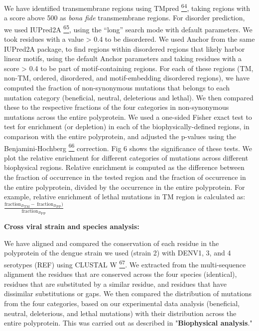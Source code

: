 \documentclass[
]{article}
\begin{document}
We have identified transmembrane regions using TMpred
\href{https://paperpile.com/c/REZjPf/pdAby}{\textsuperscript{64}},
taking regions with a score above 500 as \emph{bona fide} transmembrane
regions. For disorder prediction, we used IUPred2A
\href{https://paperpile.com/c/REZjPf/GYlhT}{\textsuperscript{65}}, using
the ``long'' search mode with default parameters. We took residues with
a value \textgreater{} 0.4 to be disordered. We used Anchor from the
same IUPred2A package, to find regions within disordered regions that
likely harbor linear motifs, using the default Anchor parameters and
taking residues with a score \textgreater{} 0.4 to be part of
motif-containing regions. For each of these regions (TM, non-TM,
ordered, disordered, and motif-embedding disordered regions), we have
computed the fraction of non-synonymous mutations that belongs to each
mutation category (beneficial, neutral, deleterious and lethal). We then
compared these to the respective fractions of the four categories in
non-synonymous mutations across the entire polyprotein. We used a
one-sided Fisher exact test to test for enrichment (or depletion) in
each of the biophysically-defined regions, in comparison with the entire
polyprotein, and adjusted the p-values using the Benjamini-Hochberg
\href{https://paperpile.com/c/REZjPf/lMDMS}{\textsuperscript{66}}
correction. Fig 6 shows the significance of these tests. We plot the
relative enrichment for different categories of mutations across
different biophysical regions. Relative enrichment is computed as the
difference between the fraction of occurrence in the tested region and
the fraction of occurrence in the entire polyprotein, divided by the
occurrence in the entire polyprotein. For example, relative enrichment
of lethal mutations in TM region is calculated as:
\(\frac{{\text{fraction}_{B}}_{\text{TM}} - \ {\text{fraction}_{B}}_{\text{PP}})}{{\text{fraction}_{B}}_{\text{PP}}}\)

\textbf{Cross viral strain and species analysis:}

We have aligned and compared the conservation of each residue in the
polyprotein of the dengue strain we used (strain 2) with DENV1, 3, and 4
serotypes (REF) using CLUSTAL W
\href{https://paperpile.com/c/REZjPf/gK8Xk}{\textsuperscript{67}}. We
extracted from the multi-sequence alignment the residues that are
conserved across the four species (identical), residues that are
substituted by a similar residue, and residues that have dissimilar
substitutions or gaps. We then compared the distribution of mutations
from the four categories, based on our experimental data analysis
(beneficial, neutral, deleterious, and lethal mutations) with their
distribution across the entire polyprotein. This was carried out as
described in "\textbf{Biophysical analysis}."
\end{document}
